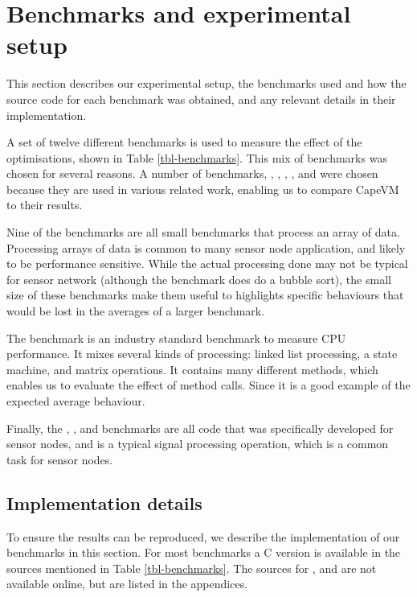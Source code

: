 
\section{Benchmarks and experimental setup}
\label{sec-evaluation-benchmarks}

This section describes our experimental setup, the benchmarks used and how the source code for each benchmark was obtained, and any relevant details in their implementation.

A set of twelve different benchmarks is used to measure the effect of the optimisations, shown in Table \ref{tbl-benchmarks}. This mix of benchmarks was chosen for several reasons. A number of benchmarks, , , , , and  were chosen because they are used in various related work, enabling us to compare CapeVM to their results.

Nine of the benchmarks are all small benchmarks that process an array of data. Processing arrays of data is common to many sensor node application, and likely to be performance sensitive. While the actual processing done may not be typical for sensor network (although the  benchmark does do a bubble sort), the small size of these benchmarks make them useful to highlights specific behaviours that would be lost in the averages of a larger benchmark.

The  benchmark is an industry standard benchmark to measure CPU performance. It mixes several kinds of processing: linked list processing, a state machine, and matrix operations.
It contains many different methods, which enables us to evaluate the effect of method calls. Since  it is a good example of the expected average behaviour.

Finally, the , ,  and  benchmarks are all code that was specifically developed for sensor nodes, and  is a typical signal processing operation, which is a common task for sensor nodes.


\subsection{Implementation details}
To ensure the results can be reproduced, we describe the implementation of our benchmarks in this section. For most benchmarks a C version is available in the sources mentioned in Table \ref{tbl-benchmarks}. The sources for ,  and  are not available online, but are listed in the appendices.

